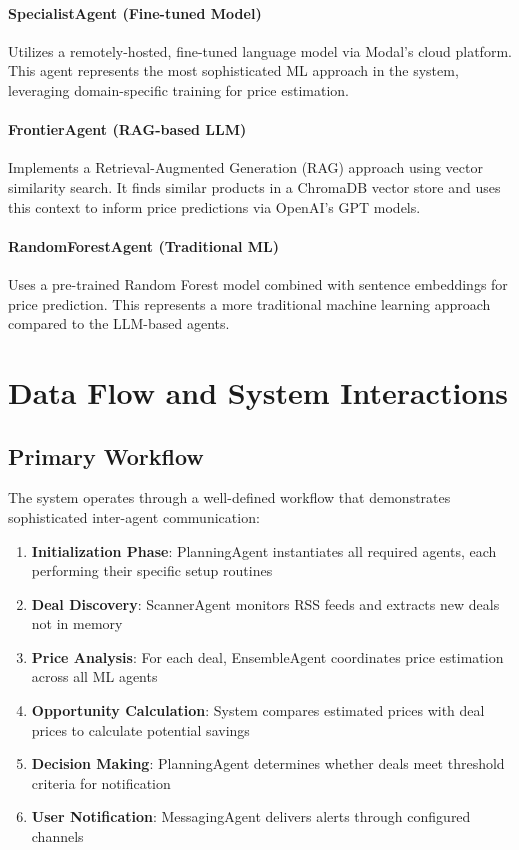 \paragraph{SpecialistAgent (Fine-tuned Model)}
Utilizes a remotely-hosted, fine-tuned language model via Modal's cloud platform. This agent represents the most sophisticated ML approach in the system, leveraging domain-specific training for price estimation.

\paragraph{FrontierAgent (RAG-based LLM)}
Implements a Retrieval-Augmented Generation (RAG) approach using vector similarity search. It finds similar products in a ChromaDB vector store and uses this context to inform price predictions via OpenAI's GPT models.

\paragraph{RandomForestAgent (Traditional ML)}
Uses a pre-trained Random Forest model combined with sentence embeddings for price prediction. This represents a more traditional machine learning approach compared to the LLM-based agents.

\section{Data Flow and System Interactions}

\subsection{Primary Workflow}

The system operates through a well-defined workflow that demonstrates sophisticated inter-agent communication:

\begin{enumerate}
\item \textbf{Initialization Phase}: PlanningAgent instantiates all required agents, each performing their specific setup routines
\item \textbf{Deal Discovery}: ScannerAgent monitors RSS feeds and extracts new deals not in memory
\item \textbf{Price Analysis}: For each deal, EnsembleAgent coordinates price estimation across all ML agents
\item \textbf{Opportunity Calculation}: System compares estimated prices with deal prices to calculate potential savings
\item \textbf{Decision Making}: PlanningAgent determines whether deals meet threshold criteria for notification
\item \textbf{User Notification}: MessagingAgent delivers alerts through configured channels
\end{enumerate}

